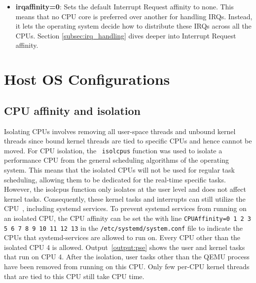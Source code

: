 \documentclass[MMR,Master,english]{twbook}
\begin{document}
\begin{itemize}
	\item \textbf{irqaffinity=0}: Sets the default Interrupt Request affinity to none. This means that no CPU core is preferred over another for handling IRQs. Instead, it lets the operating system decide how to distribute these IRQs across all the CPUs. Section \ref{subsec:irq_handling} dives deeper into Interrupt Request affinity.
\end{itemize}

\section{Host OS Configurations}\label{sec:host_configurations}
\subsection{CPU affinity and isolation}\label{subsec:cpu_isolation}

Isolating CPUs involves removing all user-space threads and unbound kernel threads since bound kernel threads are tied to specific CPUs and hence cannot be moved. For CPU isolation, the ~\texttt{isolcpus} function was used to isolate a performance CPU from the general scheduling algorithms of the operating system. This means that the isolated CPUs will not be used for regular task scheduling, allowing them to be dedicated for the real-time specific tasks. However, the isolcpus function only isolates at the user level and does not affect kernel tasks. Consequently, these kernel tasks and interrupts can still utilize the CPU~\cite{maPerformanceTuningKVMbased}, including systemd services. To prevent systemd services from running on an isolated CPU, the CPU affinity can be set the with line \texttt{CPUAffinity=0 1 2 3 5 6 7 8 9 10 11 12 13} in the \texttt{/etc/systemd/system.conf} file to indicate the CPUs that systemd-services are allowed to run on. Every CPU other than the isolated CPU 4 is allowed. Output~\ref{output:pse} shows the user and kernel tasks that run on CPU 4. After the isolation, user tasks other than the QEMU process have been removed from running on this CPU. Only few per-CPU kernel threads that are tied to this CPU still take CPU time.
\end{document}
